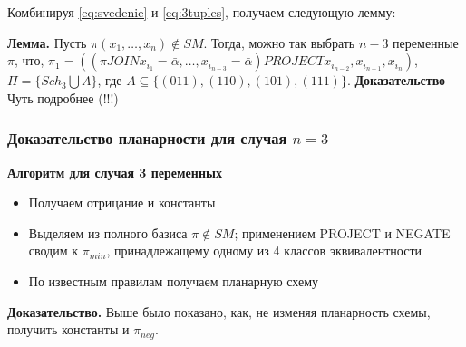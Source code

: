 \documentclass[12pt]{article}
\begin{document}
Комбинируя \ref{eq:svedenie} и \ref{eq:3tuples}, получаем следующую лемму:

\label{eq:main_lemma}
\textbf{Лемма.} Пусть $\pi(x_1, \dots, x_n) \notin SM$. Тогда, можно так выбрать $n-3$ переменные $\pi$, что,
$\pi_1 = ((\pi JOIN x_{i_1}=\bar{\alpha}, \dots, x_{i_{n-3}}=\bar{\alpha}) PROJECT x_{i_{n-2}}, x_{i_{n-1}}, x_{i_n})$,
$\Pi = \{ Sch_3 \bigcup A \}$, где $A \subseteq \{ (011), (110), (101), (111) \} $.
\textbf{Доказательство} Чуть подробнее (!!!)

\subsubsection{Доказательство планарности для случая $n = 3$}

\textbf{Алгоритм для случая 3 переменных}
\begin{itemize}
\item{Получаем отрицание и константы}
\item{Выделяем из полного базиса $\pi \notin SM$; применением PROJECT и NEGATE сводим к $\pi_{min}$,
 принадлежащему одному из 4 классов эквивалентности}
\item{По известным правилам получаем планарную схему}
\end{itemize}

\textbf{Доказательство.}
Выше было показано, как, не изменяя планарность схемы, получить константы и $\pi_{neg}$. 
\end{document}
